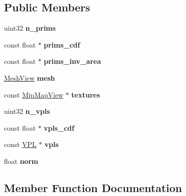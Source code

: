 \subsection*{Public Members}
\begin{DoxyCompactItemize}
\item 
\mbox{\label{struct_mesh_light_a192e774d65e4193bf0fe9f8f96466582}} 
uint32 {\bfseries n\+\_\+prims}
\item 
\mbox{\label{struct_mesh_light_a38368cd0949e9ee649fef574bb31f652}} 
const float $\ast$ {\bfseries prims\+\_\+cdf}
\item 
\mbox{\label{struct_mesh_light_a6845a9b9fe3f926fc4d421c180d9ef91}} 
const float $\ast$ {\bfseries prims\+\_\+inv\+\_\+area}
\item 
\mbox{\label{struct_mesh_light_ad680e09125846fe1089f5bce9cd4ebb9}} 
\hyperlink{struct_mesh_view}{Mesh\+View} {\bfseries mesh}
\item 
\mbox{\label{struct_mesh_light_a134240d648ea32702db6ce08d6cb8f7f}} 
const \hyperlink{struct_mip_map_view}{Mip\+Map\+View} $\ast$ {\bfseries textures}
\item 
\mbox{\label{struct_mesh_light_a9103411cedd0b1428984273b52535644}} 
uint32 {\bfseries n\+\_\+vpls}
\item 
\mbox{\label{struct_mesh_light_a545baf971f56eea4a77efcf228a09ef4}} 
const float $\ast$ {\bfseries vpls\+\_\+cdf}
\item 
\mbox{\label{struct_mesh_light_a7e9cf283a1d2489bbd813b4e16330865}} 
const \hyperlink{struct_v_p_l}{V\+PL} $\ast$ {\bfseries vpls}
\item 
\mbox{\label{struct_mesh_light_ad43d099988a13da497963e699dedd639}} 
float {\bfseries norm}
\end{DoxyCompactItemize}


\subsection{Member Function Documentation}
\mbox{\label{struct_mesh_light_a86f0d4badaca1671063ce758bd04812f}} 
